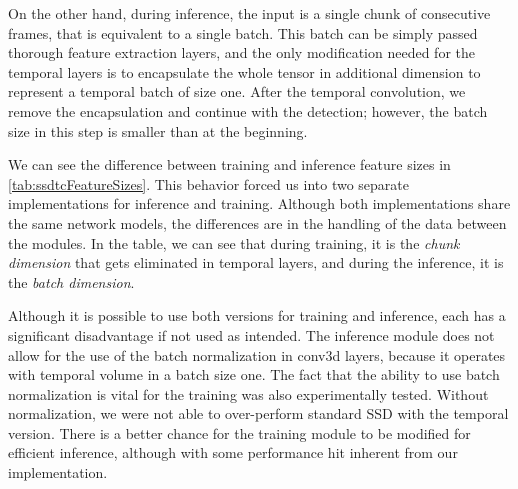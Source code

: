 On the other hand, during inference, the input is a single chunk of consecutive frames, that is equivalent to a single batch. This batch can be simply passed thorough feature extraction layers, and the only modification needed for the temporal layers is to encapsulate the whole tensor in additional dimension to represent a temporal batch of size one. After the temporal convolution, we remove the encapsulation and continue with the detection; however, the batch size in this step is smaller than at the beginning. 

We can see the difference between training and inference feature sizes in \cref{tab:ssdtcFeatureSizes}. This behavior forced us into two separate implementations for inference and training. Although both implementations share the same network models, the differences are in the handling of the data between the modules. In the table, we can see that during training, it is the \textit{chunk dimension} that gets eliminated in temporal layers, and during the inference, it is the \textit{batch dimension}. 

Although it is possible to use both versions for training and inference, each has a significant disadvantage if not used as intended. The inference module does not allow for the use of the batch normalization in conv3d layers, because it operates with temporal volume in a batch size one. The fact that the ability to use batch normalization is vital for the training was also experimentally tested. Without normalization, we were not able to over-perform standard SSD with the temporal version. There is a better chance for the training module to be modified for efficient inference, although with some performance hit inherent from our implementation. 

